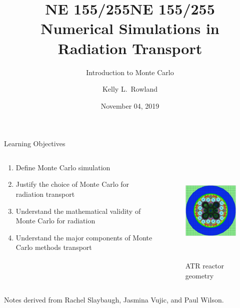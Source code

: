 \documentclass[xcolor=x11names,compress,handout]{beamer}
\title{NE 155/255}
\author{Kelly L.\ Rowland}
\date{November 04, 2019}
\renewcommand{\(}{\begin{columns}}
\renewcommand{\)}{\end{columns}}
\newcommand{\<}[1]{\begin{column}{#1}}
\renewcommand{\>}{\end{column}}
\begin{document}
\begin{frame}
\title{NE 155/255\\Numerical Simulations in Radiation Transport}
\subtitle{Introduction to Monte Carlo}
\titlepage
\end{frame}

\begin{frame}{Learning Objectives}

\begin{columns}
  \begin{column}{0.5\textwidth}
    \begin{enumerate}
    \item Define Monte Carlo simulation
    \item Justify the choice of Monte Carlo for radiation transport
    \item Understand the mathematical validity of Monte Carlo for radiation
    \item Understand the major components of Monte Carlo methods transport
    \end{enumerate}
  \end{column}
  \begin{column}{0.5\textwidth}
  	\begin{figure}
  	\begin{center}
  		\includegraphics[height=2in,clip]{fig/atr-model}
  		\caption{ATR reactor geometry}
	\end{center}
  	\end{figure}
  \end{column}
\end{columns}

Notes derived from Rachel Slaybaugh, Jasmina Vujic, and Paul Wilson.
\end{frame}
\end{document}
